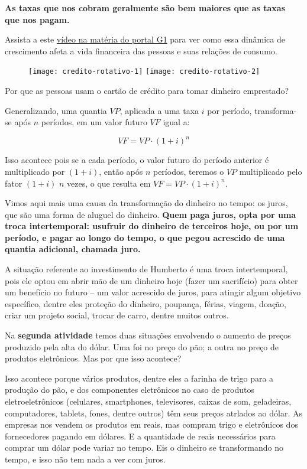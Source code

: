 \textbf{As taxas que nos cobram geralmente são bem maiores que as taxas que nos pagam.}

\begin{reflection}
Assista a este \href{http://g1.globo.com/economia/seu-dinheiro/noticia/divida-do-cartao-de-credito-sera-parcelada.ghtml}{vídeo na matéria do portal G1} para ver como essa dinâmica de crescimento afeta a vida financeira das pessoas e suas relações de consumo.

\begin{figure}[H]
\centering

\texttt{[image: credito-rotativo-1]}
\texttt{[image: credito-rotativo-2]}
\end{figure}

Por que as pessoas usam o cartão de crédito para tomar dinheiro emprestado?
\end{reflection}

Generalizando, uma quantia $VP$, aplicada a uma taxa $i$ por período, transforma-se após $n$ períodos, em um valor futuro $VF$ igual a:

$$VF=VP\cdot(1+i)^n $$ 

Isso acontece pois se a cada período, o valor futuro do período anterior é multiplicado por $(1+i)$, então após $n$ períodos, teremos o $VP$ multiplicado pelo fator $(1+i)$ $n$ vezes, o que resulta em $VF=VP\cdot(1+i)^n$. 

Vimos aqui mais uma causa da transformação do dinheiro no tempo: os juros, que são uma forma de aluguel do dinheiro. \textbf{Quem paga juros, opta por uma troca intertemporal: usufruir do dinheiro de terceiros hoje, ou por um período, e pagar ao longo do tempo, o que pegou acrescido de uma quantia adicional, chamada juro.}

A situação referente ao investimento de Humberto é uma troca intertemporal, pois ele optou em abrir mão de um dinheiro hoje (fazer um sacrifício) para obter um benefício no futuro – um valor acrescido de juros, para atingir algum objetivo específico, dentre eles proteção do dinheiro, poupança, férias, viagem, doação, criar um projeto social, trocar de carro, dentre muitos outros. 

Na \textbf{segunda atividade} temos duas situações envolvendo o aumento de preços produzido pela alta do dólar. Uma foi no preço do pão; a outra no preço de produtos eletrônicos. Mas por que isso acontece?

Isso acontece porque vários produtos, dentre eles a farinha de trigo para a produção do pão, e dos componentes eletrônicos no caso de produtos eletroeletrônicos (celulares, smartphones, televisores, caixas de som, geladeiras, computadores, tablets, fones, dentre outros) têm seus preços atrlados ao dólar. As empresas nos vendem os produtos em reais, mas compram trigo e eletrônicos dos fornecedores pagando em dólares. E a quantidade de reais necessários para comprar um dólar pode variar no tempo. Eis o dinheiro se transformando no tempo, e isso não tem nada a ver com juros.


